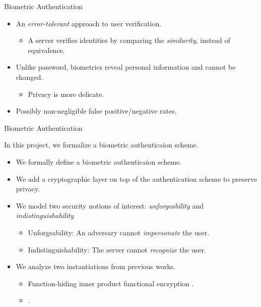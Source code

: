 \begin{frame}{Biometric Authentication}

\begin{itemize}
	\item An \emph{error-tolerant} approach to user verification.
	\begin{itemize}
		\item A server verifies identities by comparing the \emph{similarity}, instead of equivalence.
	\end{itemize}
	\pause

	\item Unlike password, biometrics reveal personal information and cannot be changed.
	\begin{itemize}
		\item Privacy is more delicate.
	\end{itemize}
	\pause

	\item Possibly non-negligible false positive/negative rates.
\end{itemize}

\end{frame}


\begin{frame}{Biometric Authentication}

In this project, we formalize a biometric authenticaion scheme.
\pause

\begin{itemize}

	\item<2-> We formally define a biometric authenticaion scheme.

	\item<3-> We add a cryptographic layer on top of the authentication scheme to preserve privacy.

	\item<4-> We model two security notions of interest: \emph{unforgeability} and \emph{indistinguishability}
	\begin{itemize}
		\item<5-> Unforgeability: An adversary cannot \emph{impersonate} the user.
		\item<6-> Indistinguishability: The server cannot \emph{recognize} the user.
	\end{itemize}

	\item<7-> We analyze two instantiations from previous works.
	\begin{itemize}
		\item<8-> Function-hiding inner product functional encryption \cite{cryptoeprint:2023/481}.
		\item<9-> {} \cite{cryptoeprint:2014/394}.
	\end{itemize}

\end{itemize}


\end{frame}


